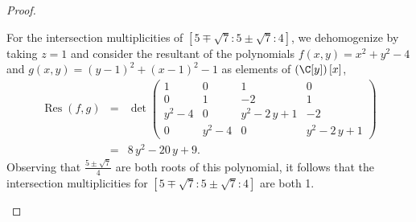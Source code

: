 \documentclass[10pt]{amsart}
\begin{document}
\begin{thm}
\begin{proof}
\begin{enumerate}[(a)]
      For the intersection multiplicities of $[5 \mp \sqrt{7} : 5 \pm \sqrt{7} : 4]$, we dehomogenize by taking $z = 1$ and consider the resultant of the polynomials $f(x,y) = x^{2} + y^{2} - 4$ and $g(x,y) = {\left(y - 1\right)}^{2} + {\left(x - 1\right)}^{2} - 1$ as elements of $\left(\C[y]\right)[x]$,
      \begin{eqnarray*}
        \operatorname{Res}(f,g) &=& \det\left(\begin{array}{cccc}
          1 & 0 & 1 & 0 \\
          0 & 1 & -2 & 1 \\
          y^{2} - 4 & 0 & y^{2} - 2 \, y + 1 & -2 \\
          0 & y^{2} - 4 & 0 & y^{2} - 2 \, y + 1
        \end{array}\right) \\
        &=& 8 \, y^{2} - 20 \, y + 9.
      \end{eqnarray*}
      Observing that $\frac{5 \pm \sqrt{7}}{4}$ are both roots of this polynomial, it follows that the intersection multiplicities for $[5 \mp \sqrt{7} : 5 \pm \sqrt{7} : 4]$ are both 1.
    \end{enumerate}
  \end{proof}
\end{thm}
\end{document}
